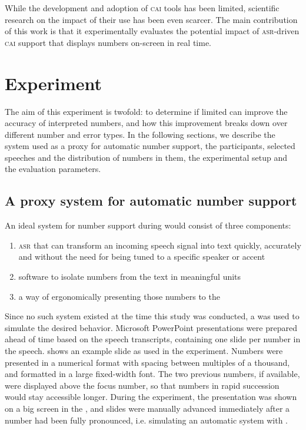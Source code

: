 \documentclass[output=paper]{langsci/langscibook}
\begin{document}
While the development and adoption of \textsc{cai} tools has been limited, scientific research on the impact of their use has been even scarcer. The main contribution of this work is that it experimentally evaluates the potential impact of \textsc{asr}-driven \textsc{cai} support that displays numbers on-screen in real time.

\section{Experiment}

The aim of this experiment is twofold: to determine if limited  can improve the accuracy of interpreted numbers, and how this improvement breaks down over different number and error types. In the following sections, we describe the system used as a proxy for automatic number support, the participants, selected speeches and the distribution of numbers in them, the experimental setup and the evaluation parameters.

\subsection{A proxy system for automatic number support}
An ideal system for number support during  would consist of three components:

\begin{enumerate}
\item \textsc{asr} that can transform an incoming speech signal into text quickly, accurately and without the need for being tuned to a specific speaker or accent 
\item software to isolate numbers from the text in meaningful units 
\item a way of ergonomically presenting those numbers to the 
\end{enumerate}

Since no such system existed at the time this study was conducted, a  was used to simulate the desired behavior. Microsoft PowerPoint presentations were prepared ahead of time based on the speech transcripts, containing one slide per number in the speech.  shows an example slide as used in the experiment. Numbers were presented in a numerical format with spacing between multiples of a thousand, and formatted in a large fixed-width font. The two previous numbers, if available, were displayed above the focus number, so that numbers in rapid succession would stay accessible longer. During the experiment, the presentation was shown on a big screen in the , and slides were manually advanced immediately after a number had been fully pronounced, i.e. simulating an automatic system with .
\end{document}
